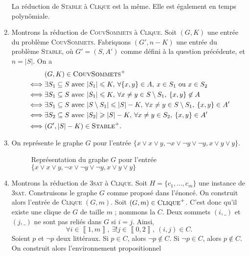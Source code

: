 \begin{enumerate}
		La réduction de \textsc{Stable} à \textsc{Clique} est la même. Elle est également en temps polynômiale.
	\item Montrons la réduction de \textsc{CouvSommets} à \textsc{Clique}.
		Soit $(G, K)$\/ une entrée du problème \textsc{CouvSommets}. Fabriquons $(G', n - K)$\/ une entrée du problème \textsc{Stable}, où $G' = (S, A')$\/ comme défini à la question précédente, et $n = |S|$. On a 
		\begin{align*}
			&(G, K) \in \textsc{CouvSommets}^+\\
			\iff& \exists S_1 \subseteq S \text{ avec } |S_1| \le K,\:\forall \{x,y\} \in A,\: x \in S_1 \text{ ou } x \in S_2\\
			\iff& \exists S_1 \subseteq S \text{ avec } |S_1| \le K,\:\forall x \neq y \in S \setminus S_1,\: \{x,y\} \not\in A\\
			\iff& \exists S_1 \subseteq S \text{ avec } |S \setminus S_1| \le |S| - K,\:\forall x \neq y \in S \setminus S_1,\: \{x,y\}  \in A'\\
			\iff& \exists S_2 \subseteq S \text{ avec }|S_2| \ge |S| - K,\:\forall x \neq y \in S_2,\: \{x,y\}  \in A'\\
			\iff& (G', |S|-K) \in \textsc{Stable}^+.
		\end{align*}
	\item On représente le graphe $G$\/ pour l'entrée $\{x \lor x \lor y, \lnot x \lor \lnot y \lor \lnot y, x \lor y \lor y\}$.
		\begin{figure}[H]
			\centering
			\caption{Représentation du graphe $G$\/ pour l'entrée $\{x \lor x \lor y, \lnot x \lor \lnot y \lor \lnot y, x \lor y \lor y\}$}
		\end{figure}
	\item Montrons la réduction de 3\textsc{sat} à \textsc{Clique}.
		Soit $H = \{c_1, \ldots, c_m\}$\/ une instance de 3\textsc{sat}.
		Construisons le graphe $G$\/ comme proposé dans l'énoncé. On construit alors l'entrée de \textsc{Clique} $(G, m)$.
		Soit $(G, m) \in \textsc{Clique}^+$. C'est donc qu'il existe une clique de $G$\/ de taille $m$ ; nommons la $C$.
		Deux sommets $(i, \_)$\/ et $(j, \_)$\/ ne sont pas reliés dans $G$\/ si $i = j$. Ainsi, \[
			\forall i \in \left\llbracket 1,m \right\rrbracket,\:\exists !j \in \left\llbracket 0,2 \right\rrbracket,\: (i,j) \in C
		.\]
		Soient $p$\/ et $\lnot p$\/ deux littéraux. Si $p \in C$, alors $\lnot p \not\in C$. Si $\lnot p \in C$, alors $p \not\in C$. On construit alors l'environnement propositionnel
		\begin{align*}

\end{align*}
\end{enumerate}

